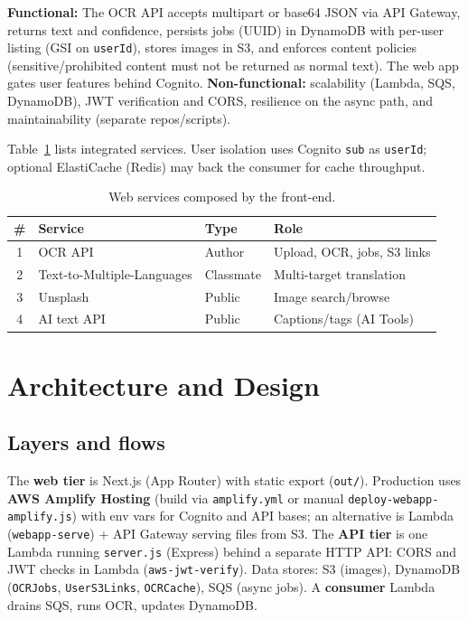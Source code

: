\documentclass[conference]{IEEEtran}
\begin{document}
\textbf{Functional:} The OCR API accepts multipart or base64 JSON via API Gateway, returns text and confidence, persists jobs (UUID) in DynamoDB with per-user listing (GSI on \texttt{userId}), stores images in S3, and enforces content policies (sensitive/prohibited content must not be returned as normal text). The web app gates user features behind Cognito. \textbf{Non-functional:} scalability (Lambda, SQS, DynamoDB), JWT verification and CORS, resilience on the async path, and maintainability (separate repos/scripts).

Table~\ref{tab:services} lists integrated services. User isolation uses Cognito \texttt{sub} as \texttt{userId}; optional ElastiCache (Redis) may back the consumer for cache throughput.

\begin{table}[t]
\caption{Web services composed by the front-end.}
\label{tab:services}
\centering
\footnotesize
\begin{tabular}{@{}c l l l@{}}
\toprule
\# & Service & Type & Role \\
\midrule
1 & OCR API & Author & Upload, OCR, jobs, S3 links \\
2 & Text-to-Multiple-Languages & Classmate & Multi-target translation \\
3 & Unsplash & Public & Image search/browse \\
4 & AI text API & Public & Captions/tags (AI Tools) \\
\bottomrule
\end{tabular}
\end{table}

\section{Architecture and Design}

\subsection{Layers and flows}
The \textbf{web tier} is Next.js (App Router) with static export (\texttt{out/}). Production uses \textbf{AWS Amplify Hosting} (build via \texttt{amplify.yml} or manual \texttt{deploy-webapp-amplify.js}) with env vars for Cognito and API bases; an alternative is Lambda (\texttt{webapp-serve}) + API Gateway serving files from S3. The \textbf{API tier} is one Lambda running \texttt{server.js} (Express) behind a separate HTTP API: CORS and JWT checks in Lambda (\texttt{aws-jwt-verify}). Data stores: S3 (images), DynamoDB (\texttt{OCRJobs}, \texttt{UserS3Links}, \texttt{OCRCache}), SQS (async jobs). A \textbf{consumer} Lambda drains SQS, runs OCR, updates DynamoDB.
\end{document}
